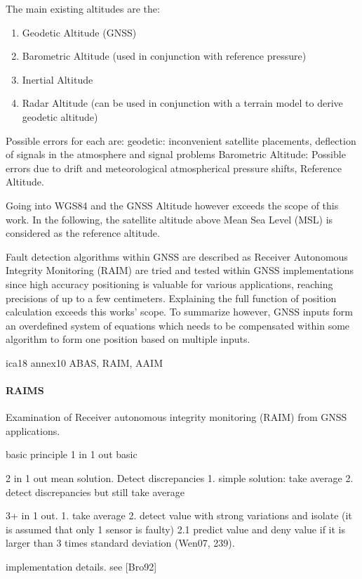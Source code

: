 The main existing altitudes are the:
\begin{enumerate}
    \item Geodetic Altitude (GNSS)
    \item Barometric Altitude (used in conjunction with reference pressure)
    \item Inertial Altitude
    \item Radar Altitude (can be used in conjunction with a terrain model to derive geodetic altitude)
\end{enumerate}
Possible errors for each are:
geodetic: inconvenient satellite placements, deflection of signals in the atmosphere and signal problems
Barometric Altitude: Possible errors due to drift and meteorological atmospherical pressure shifts, Reference Altitude.

Going into WGS84 and the GNSS Altitude however exceeds the scope of this work. In the following, the satellite altitude above Mean Sea Level (MSL) is considered as the reference altitude.


Fault detection algorithms within GNSS are described as Receiver Autonomous Integrity Monitoring (RAIM) are tried and tested within GNSS implementations since high accuracy positioning is valuable for various applications, reaching precisions of up to a few centimeters. Explaining the full function of position calculation exceeds this works' scope. To summarize however, GNSS inputs form an overdefined system of equations which needs to be compensated within some algorithm to form one position based on multiple inputs.


ica18 annex10
ABAS, RAIM, AAIM

\paragraph{RAIMS}
Examination of Receiver autonomous integrity monitoring (RAIM) from GNSS applications.


basic principle
1 in 1 out
basic


2 in 1 out
mean solution. Detect discrepancies
1. simple solution: take average
2. detect discrepancies but still take average

3+ in 1 out.
1. take average
2. detect value with strong variations and isolate (it is assumed that only 1 sensor is faulty)
2.1 predict value and deny value if it is larger than 3 times standard deviation (Wen07, 239).

implementation details. see [Bro92]





